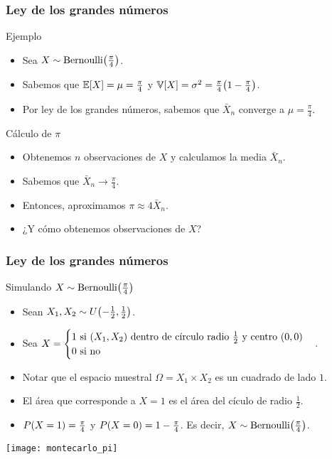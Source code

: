 \documentclass[table]{beamer}
\begin{document}
\begin{frame}
    \frametitle{Ley de los grandes números}
    \begin{block}{Ejemplo}
        \begin{itemize}
            \item Sea $X \sim \bernoulli{\frac{\pi}{4}}$.
            \item Sabemos que $\expected{X} = \mu = \frac{\pi}{4}$ y $\variance{X} = \sigma^{2} = \frac{\pi}{4} \parens{1 - \frac{\pi}{4}}$.
            \item Por ley de los grandes números, sabemos que $\bar{X}_{n}$ converge a $\mu = \frac{\pi}{4}$.
        \end{itemize}
    \end{block}
    \begin{block}{Cálculo de $\pi$}
        \begin{itemize}
            \item Obtenemos $n$ observaciones de $X$ y calculamos la media $\bar{X}_{n}$.
            \item Sabemos que $\bar{X}_{n} \to \frac{\pi}{4}$.
            \item Entonces, aproximamos $\pi \approx 4 \bar{X}_{n}$.
            \item ¿Y cómo obtenemos observaciones de $X$?
        \end{itemize}
    \end{block}
\end{frame}

\begin{frame}
    \frametitle{Ley de los grandes números}
    \begin{block}{Simulando $X \sim \bernoulli{\frac{\pi}{4}}$}
        \begin{itemize}
            \item Sean $X_{1} , X_{2} \sim \uniform{- \frac{1}{2}}{\frac{1}{2}}$.
            \item Sea $X = \begin{cases} 1 \text{ si } \parens{X_{1}, X_{2}} \text{ dentro de círculo radio } \frac{1}{2} \text{ y centro } \parens{0, 0} \\ 0 \text{ si no} \end{cases}$.
            \item Notar que el espacio muestral $\Omega = X_{1} \times X_{2}$ es un cuadrado de lado $1$.
            \item El área que corresponde a $X = 1$ es el área del cículo de radio $\frac{1}{2}$.
            \item $\prob{X = 1} = \frac{\pi}{4}$ y $\prob{X = 0} = 1 - \frac{\pi}{4}$. Es decir, $X \sim \bernoulli{\frac{\pi}{4}}$.
        \end{itemize}
    \end{block}
    \begin{center}
        \texttt{[image: montecarlo\_pi]}
    \end{center}
\end{frame}
\end{document}
